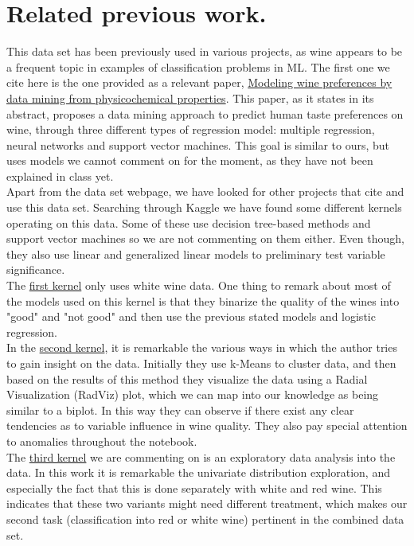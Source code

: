 \documentclass[10pt]{article}
\begin{document}
\section{Related previous work.}
This data set has been previously used in various projects, as wine appears to be a frequent topic in examples of classification problems in ML. The first one we cite here is the one provided as a relevant paper, \href{https://www.sciencedirect.com/science/article/pii/S0167923609001377?via\%3Dihub}{Modeling wine preferences by data mining from physicochemical properties}. This paper, as it states in its abstract, proposes a data mining approach to predict human taste preferences on wine, through three different types of regression model: multiple regression, neural networks and support vector machines. This goal is similar to ours, but uses models we cannot comment on for the moment, as they have not been explained in class yet. \\

Apart from the data set webpage, we have looked for other projects that cite and use this data set. Searching through Kaggle we have found some different kernels operating on this data. Some of these use decision tree-based methods and support vector machines so we are not commenting on them either. Even though, they also use linear and generalized linear models to preliminary test variable significance. \\

The \href{https://www.kaggle.com/indra90/predicting-white-wine-quality}{first kernel} only uses white wine data. One thing to remark about most of the models used on this kernel is that they binarize the quality of the wines into "good" and "not good" and then use the previous stated models and logistic regression. \\

In the \href{https://www.kaggle.com/conradws/how-good-is-this-wine-m-l-for-quality-control}{second kernel}, it is remarkable the various ways in which the author tries to gain insight on the data. Initially they use k-Means to cluster data, and then based on the results of this method they visualize the data using a Radial Visualization (RadViz) plot, which we can map into our knowledge as being similar to a biplot. In this way they can observe if there exist any clear tendencies as to variable influence in wine quality. They also pay special attention to anomalies throughout the notebook. \\

The \href{https://www.kaggle.com/danielpanizzo/red-and-white-wine-quality}{third kernel} we are commenting on is an exploratory data analysis into the data. In this work it is remarkable the univariate distribution exploration, and especially the fact that this is done separately with white and red wine. This indicates that these two variants might need different treatment, which makes our second task (classification into red or white wine) pertinent in the combined data set. \\
\end{document}
